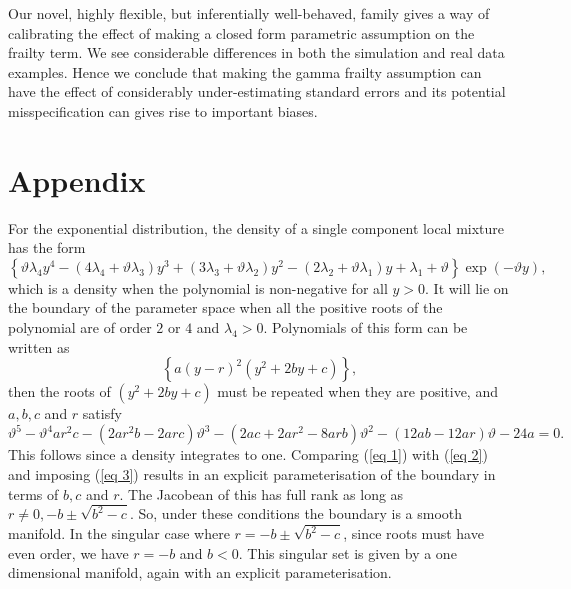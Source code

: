 \documentclass[graybox]{svmult}
\begin{document}
Our novel,  highly flexible, but inferentially well-behaved,  family gives a way of calibrating the effect of making a closed form parametric assumption on the frailty term. We see  considerable differences in both the simulation and real data examples.  Hence we conclude that  making  the gamma frailty assumption can have  the effect of considerably under-estimating standard errors and its potential misspecification can gives rise to  important biases. 






\appendix


\section*{Appendix}

For the exponential distribution, the density of a single component local mixture has the form
\begin{equation}\label{eq 1} 
\left\{\vartheta \lambda_4 y^4-(4 \lambda_4+\vartheta \lambda_3) y^3+(3\lambda_3 + \vartheta\lambda_2)y^2-(2 \lambda_2+ \vartheta \lambda_1) y+ \lambda_1+\vartheta  \right\} \exp(- \vartheta y),
\end{equation} which is a density when the polynomial is non-negative for all $y > 0$. It will lie on the boundary of the parameter space when all the positive roots of the polynomial are of order $2$ or $4$ and $\lambda_4 > 0$. Polynomials of this form can be written as
\begin{equation}\label{eq 2} 
\left\{ a(y-r)^2(y^2+2by+c) \right\},
\end{equation}  
then the roots of $(y^2+2by+c)$ must be  repeated  when they are positive,  and $a,b,c$ and $r$ satisfy 
\begin{equation}\label{eq 3} 
\vartheta^5-\vartheta^4ar^2c-(2ar^2b-2arc)\vartheta^3-(2ac+2ar^2-8arb)\vartheta^2-(12ab-12ar)\vartheta-24a =0.
\end{equation} This follows since a density integrates  to one. Comparing (\ref{eq 1}) with (\ref{eq 2}) and imposing (\ref{eq 3}) results in an explicit parameterisation of the boundary in terms of $b,c$ and $r$. The Jacobean of this has full rank as long as $r \ne 0, -b\pm \sqrt{b^2-c}.$ So, under these conditions the boundary is a smooth manifold. 
In the singular case where  $r= -b\pm \sqrt{b^2-c}$, since roots must have even order, we have $r= -b$ and  $b < 0$. This singular set is given by a one dimensional manifold, again with an explicit parameterisation.
\end{document}
